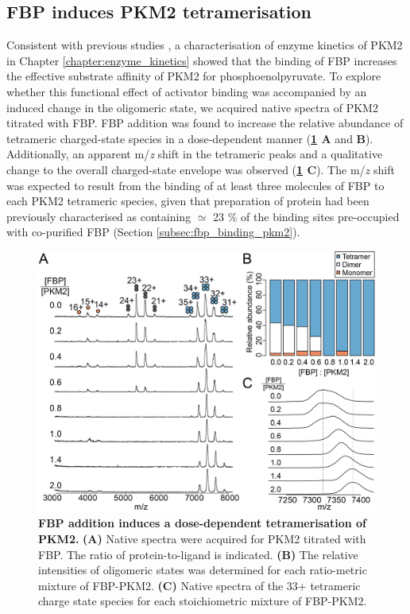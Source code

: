 \subsection{FBP induces PKM2 tetramerisation}
\label{subsec:fbp_tetramerisation}
Consistent with previous studies \cite{Yacovan:2012aa,Jiang:2010aa,Dombrauckas:2005aa,Chaneton:2012aa}, a characterisation of enzyme kinetics of PKM2 in Chapter \ref{chapter:enzyme_kinetics} showed that the binding of FBP increases the effective substrate affinity of PKM2 for phosphoenolpyruvate. To explore whether this functional effect of activator binding was accompanied by an induced change in the oligomeric state, we acquired native spectra of PKM2 titrated with FBP. FBP addition was found to increase the relative abundance of tetrameric charged-state species in a dose-dependent manner (\textbf{\ref{fig:pkm2_fbp_MS} A} and \textbf{B}).  Additionally, an apparent m/\textit{z} shift in the tetrameric peaks and a qualitative change to the overall charged-state envelope was observed (\textbf{\ref{fig:pkm2_fbp_MS} C}). The m/\textit{z} shift was expected to result from the binding of at least three molecules of FBP to each PKM2 tetrameric species, given that preparation of protein had been previously characterised as containing $\simeq$ 23 \% of the binding sites pre-occupied with co-purified FBP (Section \ref{subsec:fbp_binding_pkm2}).
%
%
%
%
%
\begin{figure}[!ht]
\includegraphics[scale=0.7]{ch5_fig2_fbp_MS.png}
\caption[FBP addition induces a dose-dependent tetramerisation of PKM2.] {\textbf{FBP addition induces a dose-dependent tetramerisation of PKM2.} \textbf{(A)} Native spectra were acquired for PKM2 titrated with FBP. The ratio of protein-to-ligand is indicated. \textbf{(B)} The relative intensities of oligomeric states was determined for each ratio-metric mixture of FBP-PKM2. \textbf{(C)} Native spectra of the 33+ tetrameric charge state species for each stoichiometric mixture of FBP-PKM2.}
\label{fig:pkm2_fbp_MS}
\end{figure}
%
%
\clearpage


